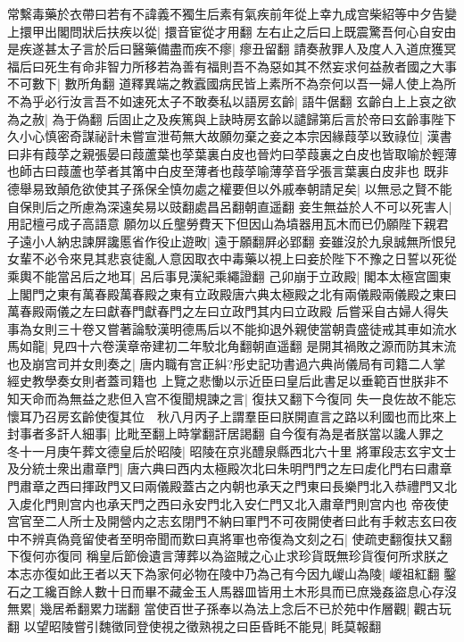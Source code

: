 常繫毒藥於衣帶曰若有不諱義不獨生后素有氣疾前年從上幸九成宫柴紹等中夕告變上擐甲出閣問狀后扶疾以從|{
	擐音宦從才用翻}
左右止之后曰上既震驚吾何心自安由是疾遂甚太子言於后曰醫藥備盡而疾不瘳|{
	瘳丑留翻}
請奏赦罪人及度人入道庶獲冥福后曰死生有命非智力所移若為善有福則吾不為惡如其不然妄求何益赦者國之大事不可數下|{
	數所角翻}
道釋異端之教蠧國病民皆上素所不為奈何以吾一婦人使上為所不為乎必行汝言吾不如速死太子不敢奏私以語房玄齡|{
	語牛倨翻}
玄齡白上上哀之欲為之赦|{
	為于偽翻}
后固止之及疾篤與上訣時房玄齡以譴歸第后言於帝曰玄齡事陛下久小心慎密奇謀祕計未嘗宣泄苟無大故願勿棄之妾之本宗因緣葭莩以致祿位|{
	漢書曰非有葭莩之親張晏曰葭蘆葉也莩葉裏白皮也晉灼曰莩葭裏之白皮也皆取喻於輕薄也師古曰葭蘆也莩者其筩中白皮至薄者也葭莩喻薄莩音孚張言葉裏白皮非也}
既非德舉易致顛危欲使其子孫保全慎勿處之權要但以外戚奉朝請足矣|{
	以無忌之賢不能自保則后之所慮為深遠矣易以豉翻處昌呂翻朝直遥翻}
妾生無益於人不可以死害人|{
	用記檀弓成子高語意}
願勿以丘壟勞費天下但因山為墳器用瓦木而已仍願陛下親君子遠小人納忠諫屏讒慝省作役止遊畋|{
	遠于願翻屛必郢翻}
妾雖沒於九泉誠無所恨兒女輩不必令來見其悲哀徒亂人意因取衣中毒藥以視上曰妾於陛下不豫之日誓以死從乘輿不能當呂后之地耳|{
	呂后事見漢紀乘繩證翻}
己卯崩于立政殿|{
	閣本太極宫圖東上閣門之東有萬春殿萬春殿之東有立政殿唐六典太極殿之北有兩儀殿兩儀殿之東曰萬春殿兩儀之左曰獻春門獻春門之左曰立政門其内曰立政殿}
后嘗采自古婦人得失事為女則三十卷又嘗著論駮漢明德馬后以不能抑退外親使當朝貴盛徒戒其車如流水馬如龍|{
	見四十六卷漢章帝建初二年駮北角翻朝直遥翻}
是開其禍敗之源而防其末流也及崩宫司并女則奏之|{
	唐内職有宫正糾?彤史記功書過六典尚儀局有司籍二人掌經史教學奏女則者蓋司籍也}
上覽之悲慟以示近臣曰皇后此書足以垂範百世朕非不知天命而為無益之悲但入宫不復聞規諫之言|{
	復扶又翻下今復同}
失一良佐故不能忘懷耳乃召房玄齡使復其位　秋八月丙子上謂羣臣曰朕開直言之路以利國也而比來上封事者多訐人細事|{
	比毗至翻上時掌翻訐居謁翻}
自今復有為是者朕當以讒人罪之　冬十一月庚午葬文德皇后於昭陵|{
	昭陵在京兆醴泉縣西北六十里}
將軍段志玄宇文士及分統士衆出肅章門|{
	唐六典曰西内太極殿次北曰朱明門門之左曰䖍化門右曰肅章門肅章之西曰揮政門又曰兩儀殿蓋古之内朝也承天之門東曰長樂門北入恭禮門又北入䖍化門則宫内也承天門之西曰永安門北入安仁門又北入肅章門則宫内也}
帝夜使宫官至二人所士及開營内之志玄閉門不納曰軍門不可夜開使者曰此有手敕志玄曰夜中不辨真偽竟留使者至明帝聞而歎曰真將軍也帝復為文刻之石|{
	使疏吏翻復扶又翻下復何亦復同}
稱皇后節儉遺言薄葬以為盜賊之心止求珍貨既無珍貨復何所求朕之本志亦復如此王者以天下為家何必物在陵中乃為己有今因九嵕山為陵|{
	嵕祖紅翻}
鑿石之工纔百餘人數十日而畢不藏金玉人馬器皿皆用土木形具而已庶幾姦盜息心存沒無累|{
	幾居希翻累力瑞翻}
當使百世子孫奉以為法上念后不已於苑中作層觀|{
	觀古玩翻}
以望昭陵嘗引魏徵同登使視之徵熟視之曰臣昏眊不能見|{
	眊莫報翻}
